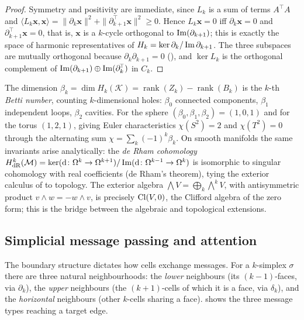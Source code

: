 \begin{proof}
Symmetry and positivity are immediate, since $L_k$ is a sum of terms $A^{\!\top}
A$ and $\langle L_k\mathbf{x}, \mathbf{x}\rangle = \|\partial_k\mathbf{x}\|^2 +
\|\partial_{k+1}^{\!\top}\mathbf{x}\|^2 \ge 0$. Hence $L_k\mathbf{x} = 0$ iff
$\partial_k\mathbf{x} = 0$ and $\partial_{k+1}^{\!\top}\mathbf{x} = 0$, that is,
$\mathbf{x}$ is a $k$-cycle orthogonal to $\operatorname{Im}(\partial_{k+1})$; this is exactly
the space of harmonic representatives of $H_k = \ker\partial_k /
\operatorname{Im}\partial_{k+1}$. The three subspaces are mutually orthogonal because
$\partial_k\partial_{k+1} = 0$ (), and $\ker L_k$
is the orthogonal complement of $\operatorname{Im}(\partial_{k+1}) \oplus
\operatorname{Im}(\partial_k^{\!\top})$ in $C_k$.
\end{proof}

The dimension $\beta_k = \dim H_k(\mathcal{K}) = \operatorname{rank}(Z_k) -
\operatorname{rank}(B_k)$ is the $k$-th \emph{Betti number}, counting
$k$-dimensional holes: $\beta_0$ connected components, $\beta_1$ independent
loops, $\beta_2$ cavities. For the sphere $(\beta_0, \beta_1, \beta_2) = (1, 0,
1)$ and for the torus $(1, 2, 1)$, giving Euler characteristics $\chi(S^2) = 2$
and $\chi(T^2) = 0$ through the alternating sum $\chi = \sum_k (-1)^k \beta_k$.
On smooth manifolds the same invariants arise analytically: the \emph{de Rham
cohomology} $H^k_{\mathrm{dR}}(\mathcal{M}) = \ker(\mathrm{d}\colon \Omega^k \to \Omega^{k+1}) /
\operatorname{Im}(\mathrm{d}\colon \Omega^{k-1} \to \Omega^k)$ is isomorphic to singular
cohomology with real coefficients (de Rham's theorem), tying the exterior
calculus of  to topology. The exterior algebra
$\bigwedge V = \bigoplus_k \bigwedge^k V$, with antisymmetric product $v \wedge w
= -w \wedge v$, is precisely $\operatorname{Cl}(V, 0)$, the Clifford algebra of the zero form;
this is the bridge between the algebraic and topological extensions.

\subsection{Simplicial message passing and attention}
\label{sec:gauge:simplicial-attention}

The boundary structure dictates how cells exchange messages. For a $k$-simplex
$\sigma$ there are three natural neighbourhoods: the \emph{lower} neighbours (its
$(k-1)$-faces, via $\partial_k$), the \emph{upper} neighbours (the $(k+1)$-cells
of which it is a face, via $\delta_k$), and the \emph{horizontal} neighbours
(other $k$-cells sharing a face).  shows the
three message types reaching a target edge.

